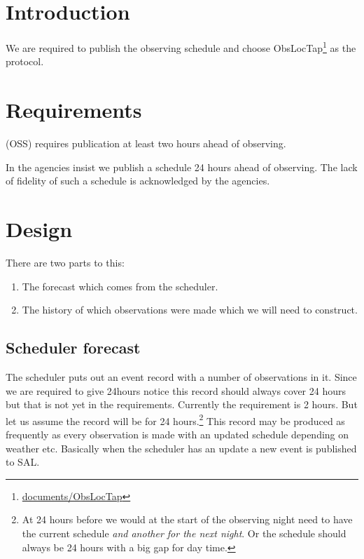 \def\DB{ObsLocTAP database}

\section{Introduction}
We are required to publish the observing schedule and choose ObsLocTap\footnote{\url{documents/ObsLocTap}} as the protocol.

\section{Requirements}

 (OSS) requires publication at least two hours ahead of observing.

In  the agencies insist we publish a schedule 24 hours ahead of observing.
The lack of fidelity of such a schedule is acknowledged by the agencies.



\section{Design}


There are two parts to this:


\begin{enumerate}
\item The forecast  which comes from the scheduler.
\item The history of which observations were made which we will need to construct.
\end{enumerate}

\subsection{Scheduler forecast}
The scheduler puts out an event record with a number of observations in it.
Since we are required to give 24hours notice this record should always cover 24 hours but that is not
yet in the requirements.
Currently the requirement is 2 hours.
But let us assume the record will be for 24 hours.\footnote{
At 24 hours before we would at the start of the observing night need to have the current schedule \emph{and another for the next night}.
Or the schedule should always be 24 hours with a big gap for day time.
}
This record may be produced as frequently as every observation is made with an updated schedule depending on weather etc.
Basically when the scheduler has an update a new event is published to SAL.

